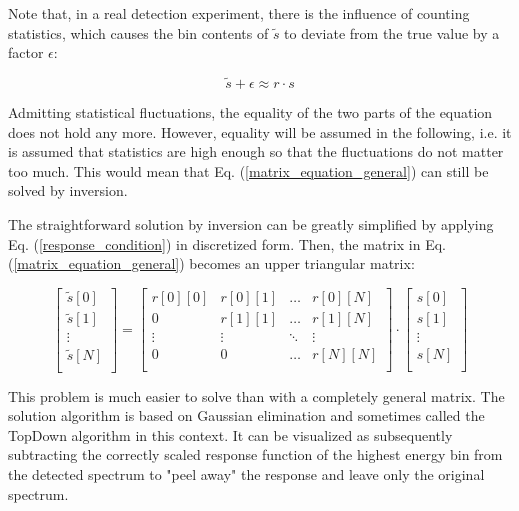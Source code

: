 \documentclass{article}
\begin{document}
Note that, in a real detection experiment, there is the influence of counting statistics, which causes the bin contents of $\tilde{s}$ to deviate from the true value by a factor $\epsilon$:

\begin{equation}
	\label{matrix_equation_statistics}
	\tilde{s} + \epsilon \approx r \cdot s
\end{equation}

Admitting statistical fluctuations, the equality of the two parts of the equation does not hold any more.
However, equality will be assumed in the following, i.e. it is assumed that statistics are high enough so that the fluctuations do not matter too much.
This would mean that Eq. (\ref{matrix_equation_general}) can still be solved by inversion.

The straightforward solution by inversion can be greatly simplified by applying Eq. (\ref{response_condition}) in discretized form. 
Then, the matrix in Eq. (\ref{matrix_equation_general}) becomes an upper triangular matrix:

\begin{equation}
	\label{matrix_equation_triangle_explicit}
	\left[ 
		\begin{array}{c}
			\tilde{s}[0] \\
			\tilde{s}[1] \\
			\vdots	\\
			\tilde{s}[N] \\
		\end{array}
	\right]
	= 
	\begin{bmatrix}
		r[0][0] & r[0][1] & \hdots & r[0][N] \\
		0       & r[1][1] & \hdots & r[1][N] \\
		\vdots  & \vdots  & \ddots & \vdots  \\
		0       & 0       & \hdots & r[N][N] \\
	\end{bmatrix}
	\cdot
	\left[ 
		\begin{array}{c}
			s[0] \\
			s[1] \\
			\vdots	\\
			s[N] \\
		\end{array}
	\right]
\end{equation}

This problem is much easier to solve than with a completely general matrix.
The solution algorithm is based on Gaussian elimination and sometimes called the TopDown algorithm in this context.
It can be visualized as subsequently subtracting the correctly scaled response function of the highest energy bin from the detected spectrum to "peel away" the response and leave only the original spectrum.
\end{document}
